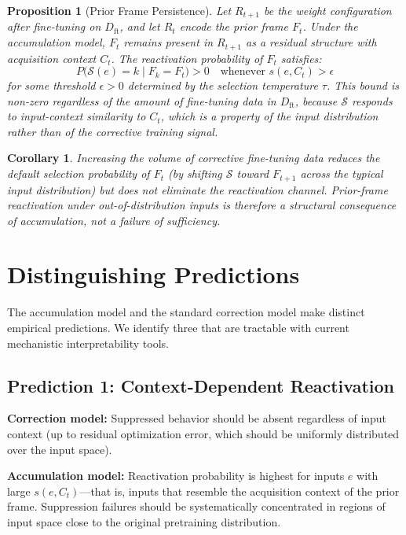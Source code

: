 \documentclass[12pt]{article}
\newtheorem{proposition}{Proposition}
\newtheorem{corollary}{Corollary}
\begin{document}
\begin{proposition}[Prior Frame Persistence]
\label{prop:persist}
Let $R_{t+1}$ be the weight configuration after fine-tuning on
$D_{\mathrm{ft}}$, and let $R_t$ encode the prior frame $F_t$.
Under the accumulation model, $F_t$ remains present in $R_{t+1}$
as a residual structure with acquisition context $C_t$.
The reactivation probability of $F_t$ satisfies:
\[
P\bigl(\mathcal{S}(e) = k \mid F_k = F_t\bigr) > 0
\quad \text{whenever } s(e, C_t) > \epsilon
\]
for some threshold $\epsilon > 0$ determined by the selection
temperature $\tau$.
This bound is non-zero regardless of the amount of fine-tuning
data in $D_{\mathrm{ft}}$, because $\mathcal{S}$ responds to
input-context similarity to $C_t$, which is a property of the
input distribution rather than of the corrective training signal.
\end{proposition}

\begin{corollary}
Increasing the volume of corrective fine-tuning data reduces the
default selection probability of $F_t$ (by shifting $\mathcal{S}$
toward $F_{t+1}$ across the typical input distribution) but does
not eliminate the reactivation channel. Prior-frame reactivation
under out-of-distribution inputs is therefore a structural
consequence of accumulation, not a failure of sufficiency.
\end{corollary}

\section{Distinguishing Predictions}

The accumulation model and the standard correction model make
distinct empirical predictions. We identify three that are
tractable with current mechanistic interpretability tools.

\subsection{Prediction 1: Context-Dependent Reactivation}

\textbf{Correction model:} Suppressed behavior should be absent
regardless of input context (up to residual optimization error,
which should be uniformly distributed over the input space).

\textbf{Accumulation model:} Reactivation probability is highest
for inputs $e$ with large $s(e, C_t)$---that is, inputs
that resemble the acquisition context of the prior frame.
Suppression failures should be systematically concentrated in
regions of input space close to the original pretraining
distribution.
\end{document}
